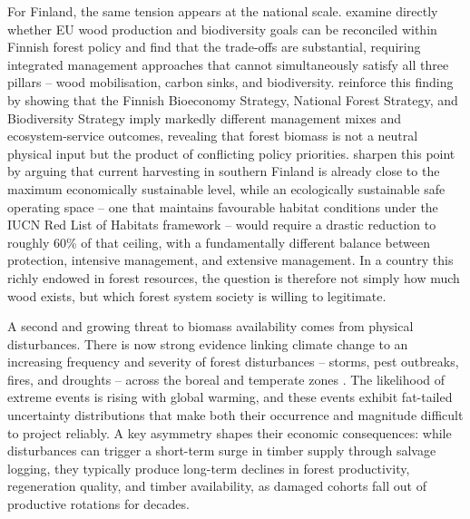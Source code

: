 \documentclass{article}
\begin{document}
For Finland, the same tension appears at the national scale. \citet{ratyEUWoodProduction2023} examine directly whether EU wood production and biodiversity goals can be reconciled within Finnish forest policy and find that the trade-offs are substantial, requiring integrated management approaches that cannot simultaneously satisfy all three pillars -- wood mobilisation, carbon sinks, and biodiversity. \citet{blattertSectoralPoliciesCause2022} reinforce this finding by showing that the Finnish Bioeconomy Strategy, National Forest Strategy, and Biodiversity Strategy imply markedly different management mixes and ecosystem-service outcomes, revealing that forest biomass is not a neutral physical input but the product of conflicting policy priorities. \citet{monkkonenEcologicallyEconomicallySustainable2024} sharpen this point by arguing that current harvesting in southern Finland is already close to the maximum economically sustainable level, while an ecologically sustainable safe operating space -- one that maintains favourable habitat conditions under the IUCN Red List of Habitats framework -- would require a drastic reduction to roughly 60\% of that ceiling, with a fundamentally different balance between protection, intensive management, and extensive management. In a country this richly endowed in forest resources, the question is therefore not simply how much wood exists, but which forest system society is willing to legitimate.

A second and growing threat to biomass availability comes from physical disturbances. There is now strong evidence linking climate change to an increasing frequency and severity of forest disturbances -- storms, pest outbreaks, fires, and droughts -- across the boreal and temperate zones \citep{andereggClimateRiskAnalysis2022b,venalainenClimateChangeInduces2020,lecina-diazCharacterizingForestVulnerability2021b}. The likelihood of extreme events is rising with global warming, and these events exhibit fat-tailed uncertainty distributions that make both their occurrence and magnitude difficult to project reliably. A key asymmetry shapes their economic consequences: while disturbances can trigger a short-term surge in timber supply through salvage logging, they typically produce long-term declines in forest productivity, regeneration quality, and timber availability, as damaged cohorts fall out of productive rotations for decades.
\end{document}
